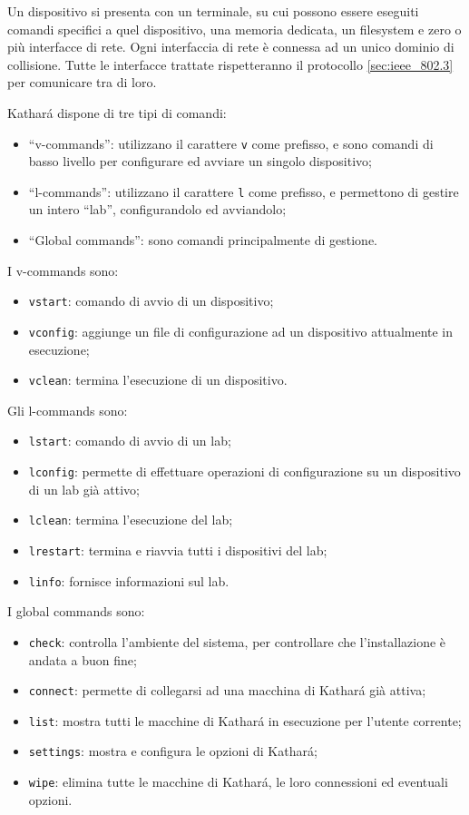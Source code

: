 \documentclass{article}
\numberwithin{equation}{subsection}
\begin{document}
Un dispositivo si presenta con un terminale, su cui possono essere eseguiti comandi specifici a quel dispositivo, una memoria dedicata, un filesystem e zero o più interfacce di rete. Ogni interfaccia di rete è 
connessa ad un unico dominio di collisione. Tutte le interfacce trattate rispetteranno il protocollo \ref{sec:ieee_802.3} per comunicare tra di loro. 


Kathar\'{a} dispone di tre tipi di comandi:
\begin{itemize}
  \item ``v-commands'': utilizzano il carattere \verb|v| come prefisso, e sono comandi di basso livello per configurare ed avviare un singolo dispositivo;
  \item ``l-commands'': utilizzano il carattere \verb|l| come prefisso, e permettono di gestire un intero ``lab'', configurandolo ed avviandolo;
  \item ``Global commands'': sono comandi principalmente di gestione. 
\end{itemize}

I v-commands sono:
\begin{itemize}
  \item \verb|vstart|: comando di avvio di un dispositivo;
  \item \verb|vconfig|: aggiunge un file di configurazione ad un dispositivo attualmente in esecuzione;
  \item \verb|vclean|: termina l'esecuzione di un dispositivo. 
\end{itemize}

Gli l-commands sono:
\begin{itemize}
  \item \verb|lstart|: comando di avvio di un lab;
  \item \verb|lconfig|: permette di effettuare operazioni di configurazione su un dispositivo di un lab già attivo;
  \item \verb|lclean|: termina l'esecuzione del lab; 
  \item \verb|lrestart|: termina e riavvia tutti i dispositivi del lab;
  \item \verb|linfo|: fornisce informazioni sul lab. 
\end{itemize}

I global commands sono:
\begin{itemize}
  \item \verb|check|: controlla l'ambiente del sistema, per controllare che l'installazione è andata a buon fine;
  \item \verb|connect|: permette di collegarsi ad una macchina di Kathar\'{a} già attiva;
  \item \verb|list|: mostra tutti le macchine di Kathar\'{a} in esecuzione per l'utente corrente;
  \item \verb|settings|: mostra e configura le opzioni di Kathar\'{a};
  \item \verb|wipe|: elimina tutte le macchine di Kathar\'{a}, le loro connessioni ed eventuali opzioni. 
\end{itemize}
\end{document}
